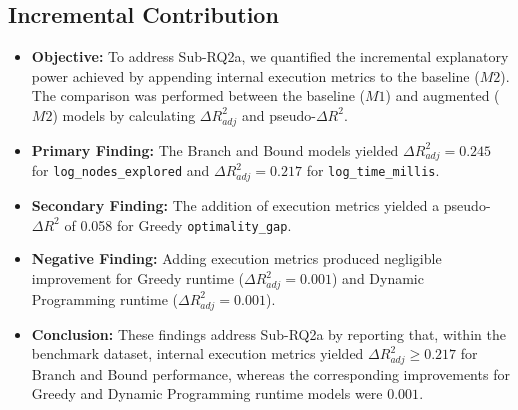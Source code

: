\documentclass[11pt,a4paper]{article}
\begin{document}
\subsection{Incremental Contribution}
\begin{itemize}
  \item \textbf{Objective:} To address Sub-RQ2a, we quantified the incremental explanatory power achieved by appending internal execution metrics to the baseline ($M2$). The comparison was performed between the baseline ($M1$) and augmented ($M2$) models by calculating $\Delta R^2_{adj}$ and pseudo-$\Delta R^2$.
  \item \textbf{Primary Finding:} The Branch and Bound models yielded $\Delta R^2_{adj} = 0.245$ for \texttt{log\_nodes\_explored} and $\Delta R^2_{adj} = 0.217$ for \texttt{log\_time\_millis}.
  \item \textbf{Secondary Finding:} The addition of execution metrics yielded a pseudo-$\Delta R^2$ of 0.058 for Greedy \texttt{optimality\_gap}.
  \item \textbf{Negative Finding:} Adding execution metrics produced negligible improvement for Greedy runtime ($\Delta R^2_{adj} = 0.001$) and Dynamic Programming runtime ($\Delta R^2_{adj} = 0.001$).
  \item \textbf{Conclusion:} These findings address Sub-RQ2a by reporting that, within the benchmark dataset, internal execution metrics yielded $\Delta R^2_{adj} \ge 0.217$ for Branch and Bound performance, whereas the corresponding improvements for Greedy and Dynamic Programming runtime models were $0.001$.
\end{itemize}
\end{document}
